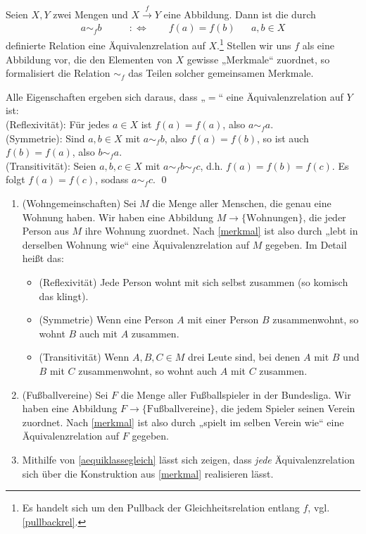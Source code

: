 \begin{bem} \label{merkmal}
    Seien $X,Y$ zwei Mengen und $X\xrightarrow{f} Y$ eine Abbildung. Dann ist die durch
    \begin{align*}
        a \sim_f b \qquad&:\Leftrightarrow\qquad f(a)=f(b) && a,b\in X
    \end{align*}
    definierte Relation eine Äquivalenzrelation auf $X$.\footnote{Es handelt sich um den Pullback der Gleichheitsrelation entlang $f$, vgl. \cref{pullbackrel}.} Stellen wir uns $f$ als eine Abbildung vor, die den Elementen von $X$ gewisse „Merkmale“ zuordnet, so formalisiert die Relation $\sim_f$ das Teilen solcher gemeinsamen Merkmale.
\end{bem}


\begin{bew}
    Alle Eigenschaften ergeben sich daraus, dass „$=$“ eine Äquivalenzrelation auf $Y$ ist: \\[0.5em]
    (Reflexivität): Für jedes $a\in X$ ist $f(a)=f(a)$, also $a\sim_f a$. \\[0.5em]
    (Symmetrie): Sind $a,b\in X$ mit $a\sim_f b$, also $f(a)=f(b)$, so ist auch $f(b)=f(a)$, also $b\sim_f a$. \\[0.5em]
    (Transitivität): Seien $a,b,c\in X$ mit $a\sim_f b\sim_f c$, d.h. $f(a)=f(b)=f(c)$. Es folgt  $f(a)=f(c)$, sodass $a\sim_f c$. \qed
\end{bew}


\begin{bsp} \quad
    \begin{enumerate}
        \item(Wohngemeinschaften) Sei $M$ die Menge aller Menschen, die genau eine Wohnung haben. Wir haben eine Abbildung $M\to \{\text{Wohnungen}\}$, die jeder Person aus $M$ ihre Wohnung zuordnet. Nach \cref{merkmal} ist also durch „lebt in derselben Wohnung wie“ eine Äquivalenzrelation auf $M$ gegeben. Im Detail heißt das:
        \begin{itemize}
            \item(Reflexivität) Jede Person wohnt mit sich selbst zusammen (so komisch das klingt).
            \item(Symmetrie) Wenn eine Person $A$ mit einer Person $B$ zusammenwohnt, so wohnt $B$ auch mit $A$ zusammen.
            \item(Transitivität) Wenn $A,B,C\in M$ drei Leute sind, bei denen $A$ mit $B$ und $B$ mit $C$ zusammenwohnt, so wohnt auch $A$ mit $C$ zusammen.
        \end{itemize}
        \item(Fußballvereine) Sei $F$ die Menge aller Fußballspieler in der Bundesliga. Wir haben eine Abbildung $F\to\{\text{Fußballvereine}\}$, die jedem Spieler seinen Verein zuordnet. Nach \cref{merkmal} ist also durch „spielt im selben Verein wie“ eine Äquivalenzrelation auf $F$ gegeben.
        \item Mithilfe von \cref{aequiklassegleich} lässt sich zeigen, dass \emph{jede} Äquivalenzrelation sich über die Konstruktion aus \cref{merkmal} realisieren lässt.
    \end{enumerate}
\end{bsp}


